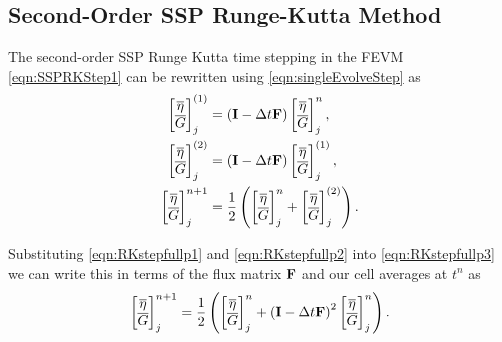 \subsection{Second-Order SSP Runge-Kutta Method}
\label{subsec:RKstepdisp}
The second-order SSP Runge Kutta time stepping in the FEVM \eqref{eqn:SSPRKStep1} can be rewritten using \eqref{eqn:singleEvolveStep} as
\begin{subequations}
	\label{eqn:RKstepfull}
	\begin{align}
	\label{eqn:RKstepfullp1}
	\begin{bmatrix}
	\overline{\eta} \\ \overline{G}
	\end{bmatrix}_j^{(1)} &= \left(\mathbf{I} - \Delta t\mathbf{F} \right)\begin{bmatrix}
	\overline{\eta} \\ \overline{G}
	\end{bmatrix}^{n}_j, \\
	\label{eqn:RKstepfullp2}
	\begin{bmatrix}
	\overline{\eta} \\ \overline{G}
	\end{bmatrix}_j^{(2)} &= \left(\mathbf{I} - \Delta t\mathbf{F} \right)\begin{bmatrix}
	\overline{\eta} \\ \overline{G}
	\end{bmatrix}_j^{(1)}, \\
	\label{eqn:RKstepfullp3}
	\begin{bmatrix}
	\overline{\eta} \\ \overline{G}
	\end{bmatrix}^{n+1}_j &= \frac{1}{2} \left(\begin{bmatrix}
	\overline{\eta} \\ \overline{G}
	\end{bmatrix}^{n}_j + \begin{bmatrix}
	\overline{\eta} \\ \overline{G}
	\end{bmatrix}_j^{(2)}\right).
	\end{align}
\end{subequations}

Substituting \eqref{eqn:RKstepfullp1} and \eqref{eqn:RKstepfullp2} into \eqref{eqn:RKstepfullp3} we can write this in terms of the flux matrix $\mathbf{F}$ and our cell averages at $t^n$ as
\begin{equation*}
\begin{bmatrix}
\overline{\eta} \\ \overline{G}
\end{bmatrix}^{n+1}_j = \frac{1}{2} \left(\begin{bmatrix}
\overline{\eta} \\ \overline{G}
\end{bmatrix}^{n}_j + \left(\mathbf{I} - \Delta t\mathbf{F} \right)^2 \begin{bmatrix}
\overline{\eta} \\ \overline{G}
\end{bmatrix}^{n}_j\right).
\end{equation*}

